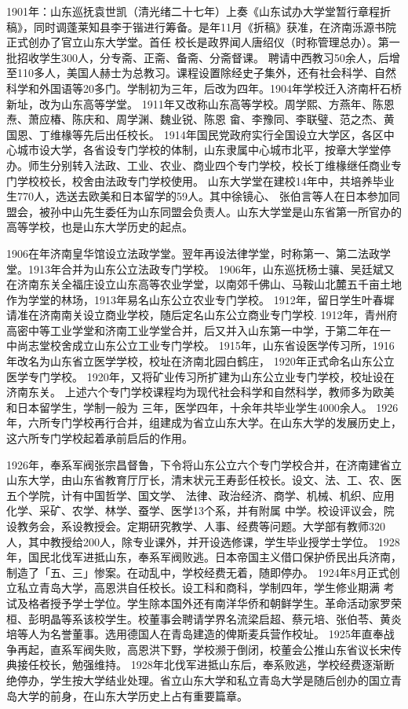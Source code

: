 \documentclass[openany]{sduthesis} %
\begin{document}
1901年：山东巡抚袁世凯（清光绪二十七年）上奏《山东试办大学堂暂行章程折稿》，同时调蓬莱知县李于锴进行筹备。是年11月《折稿》获准，在济南泺源书院正式创办了官立山东大学堂。首任 校长是政界闻人唐绍仪（时称管理总办）。第一批招收学生300人，分专斋、正斋、备斋、分斋督课。 聘请中西教习50余人，后增至110多人，美国人赫士为总教习。课程设置除经史子集外，还有社会科学、自然科学和外国语等20多门。学制初为三年，后改为四年。1904年学校迁入济南杆石桥新址，改为山东高等学堂。 1911年又改称山东高等学校。周学熙、方燕年、陈恩焘、萧应椿、陈庆和、周学渊、魏业锐、陈恩 畲、李豫同、李联璧、范之杰、黄国恩、丁维椽等先后出任校长。 1914年国民党政府实行全国设立大学区，各区中心城市设大学，各省设专门学校的体制，山东隶属中心城市北平，按章大学堂停办。师生分别转入法政、工业、农业、商业四个专门学校，校长丁维椽继任商业专门学校校长，校舍由法政专门学校使用。 山东大学堂在建校14年中，共培养毕业生770人，选送去欧美和日本留学的59人。其中徐镜心、 张伯言等人在日本参加同盟会，被孙中山先生委任为山东同盟会负责人。山东大学堂是山东省第一所官办的高等学校，也是山东大学历史的起点。

1906在年济南皇华馆设立法政学堂。翌年再设法律学堂，时称第一、第二法政学堂。1913年合并为山东公立法政专门学校。 1906年，山东巡抚杨士骧、吴廷斌又在济南东关全福庄设立山东高等农业学堂，以南郊千佛山、马鞍山北麓五千亩土地作为学堂的林场，1913年易名山东公立农业专门学校。 1912年，留日学生叶春墀请准在济南南关设立商业学校，随后定名山东公立商业专门学校. 1912年，青州府高密中等工业学堂和济南工业学堂合并，后又并入山东第一中学，于第二年在一 中尚志堂校舍成立山东公立工业专门学校。 1915年，山东省设医学传习所，1916年改名为山东省立医学学校，校址在济南北园白鹤庄， 1920年正式命名山东公立医学专门学校。 1920年，又将矿业传习所扩建为山东公立业专门学校，校址设在济南东关。 上述六个专门学校课程均为现代社会科学和自然科学，教师多为欧美和日本留学生，学制一般为 三年，医学四年，十余年共毕业学生4000余人。 1926年，六所专门学校再行合并，组建成为省立山东大学。在山东大学的发展历史上，这六所专门学校起着承前启后的作用。

1926年，奉系军阀张宗昌督鲁，下令将山东公立六个专门学校合并，在济南建省立山东大学，由山东省教育厅厅长，清末状元王寿彭任校长。设文、法、工、农、医五个学院，计有中国哲学、国文学、 法律、政治经济、商学、机械、机织、应用化学、采矿、农学、林学、蚕学、医学13个系，并有附属 中学。校设评议会，院设教务会，系设教授会。定期研究教学、人事、经费等问题。大学部有教师320 人，其中教授给200人，除专业课外，并开设选修课，学生毕业授学士学位。 1928年，国民北伐军进抵山东，奉系军阀败逃。日本帝国主义借口保护侨民出兵济南，制造了「五、三」惨案。在动乱中，学校经费无着，随即停办。 1924年8月正式创立私立青岛大学，高恩洪自任校长。设工科和商科，学制四年，学生修业期满 考试及格者授予学士学位。学生除本国外还有南洋华侨和朝鲜学生。革命活动家罗荣桓、彭明晶等系该校学生。校董事会聘请学界名流梁启超、蔡元培、张伯苓、黄炎培等人为名誉董事。选用德国人在青岛建造的俾斯麦兵营作校址。 1925年直奉战争再起，直系军阀失败，高恩洪下野，学校濒于倒闭，校董会公推山东省议长宋传典接任校长，勉强维持。 1928年北伐军进抵山东后，奉系败逃，学校经费逐渐断绝停办，学生按大学结业处理。省立山东大学和私立青岛大学是随后创办的国立青岛大学的前身，在山东大学历史上占有重要篇章。
\end{document}
